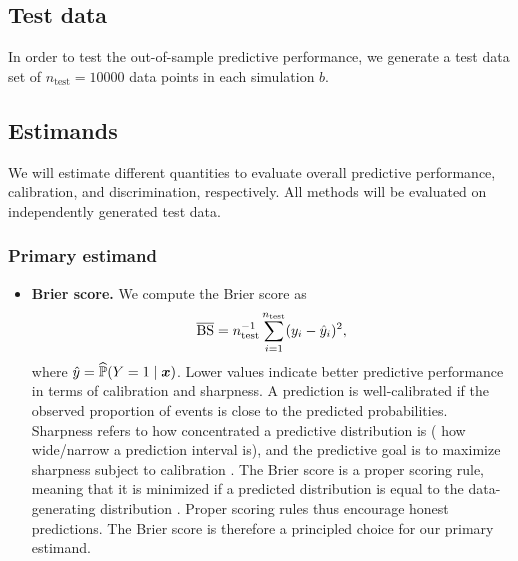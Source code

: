 \subsection*{Test data}
In order to test the out-of-sample predictive performance, we generate a test data set of
$n_{\text{test}} = 10000$ data points in each simulation $b$.

\subsection{Estimands} \label{sec:estimands}
We will estimate different quantities to evaluate overall predictive performance,
calibration, and discrimination, respectively. All methods will be evaluated on
independently generated test data.

\subsubsection{Primary estimand}

\begin{itemize}
  \item \textbf{Brier score.} We compute the Brier score as
  $$\operatorname{\overline{BS}} = n_{\text{test}}^{-1} \sum_{i=1}^{n_{\text{test}}} (y_{i} - \hat{y}_{i})^2,$$
  where $\hat{y} = \widehat{\mathbb{P}}(Y = 1 \mid \text{\boldmath$x$})$.
  Lower values indicate better predictive performance in terms of calibration and
  sharpness. A prediction is well-calibrated if the observed proportion
  of events is close to the predicted probabilities. Sharpness refers to how
  concentrated a predictive distribution is (\eg{} how wide/narrow a prediction interval is),
  and the predictive goal is to maximize sharpness subject to calibration
  \citep{Gneiting2008}.
  The Brier score is a proper scoring rule, meaning that it is minimized if a
  predicted distribution is equal to the data-generating distribution
  \citep{Gneiting2007}. Proper scoring rules thus encourage honest
  predictions. The Brier score is therefore a principled choice for our primary estimand.
\end{itemize}


